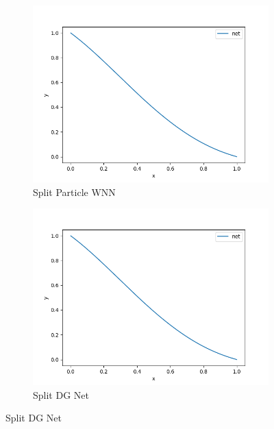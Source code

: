 \begin{figure}[H]
    \begin{subfigure}{0.5\textwidth}  
        \centering  
        \includegraphics[width=0.9\linewidth]{./pics/final/possion/dgnet1d/splitpwnn1.png}  
        \caption{Split Particle WNN}  
    \end{subfigure}%
    \begin{subfigure}{0.5\textwidth}  
        \centering  
        \includegraphics[width=0.9\linewidth]{./pics/final/possion/dgnet1d/dgnet1.png}  
        \caption{Split DG Net}
    \end{subfigure} 
\end{figure} 

